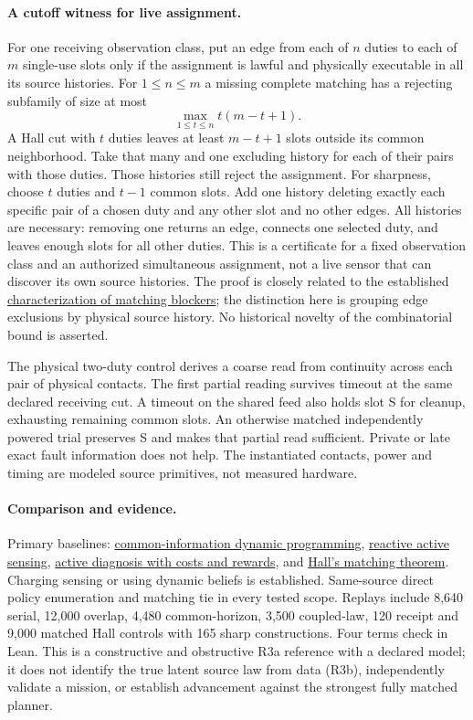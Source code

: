 \documentclass[11pt]{article}
\begin{document}
\paragraph{A cutoff witness for live assignment.}
For one receiving observation class, put an edge from each of $n$
duties to each of $m$ single-use slots only if the assignment is
lawful and physically executable in all its source histories.
For $1\le n\le m$ a missing complete matching has a rejecting
subfamily of size at most
\[
             \max_{1\le t\le n} t(m-t+1).
\]
A Hall cut with $t$ duties leaves at least $m-t+1$ slots outside
its common neighborhood. Take that many and one excluding
history for each of their pairs with those duties. Those
histories still reject the assignment. For sharpness, choose
$t$ duties and $t-1$ common slots. Add one history deleting
exactly each specific pair of a chosen duty and any other
slot and no other edges. All histories are necessary: removing
one returns an edge, connects one selected duty, and leaves
enough slots for all other duties. This is a certificate for a
fixed observation class and an authorized simultaneous
assignment, not a live sensor that can discover its own
source histories. The proof is closely related to the established
\href{https://doi.org/10.1002/jgt.20180}{characterization of matching blockers};
the distinction here is grouping edge exclusions by physical
source history. No historical novelty of the combinatorial
bound is asserted.

The physical two-duty control derives a coarse read from
continuity across each pair of physical contacts. The
first partial reading survives timeout at the same
declared receiving cut. A timeout on the shared feed also
holds slot S for cleanup, exhausting remaining common slots.
An otherwise matched independently powered trial preserves S
and makes that partial read sufficient. Private or late exact
fault information does not help. The instantiated contacts,
power and timing are modeled source primitives, not measured
hardware.

\paragraph{Comparison and evidence.}
Primary baselines: \href{https://arxiv.org/abs/1209.1695}{common-information dynamic programming},
\href{https://arxiv.org/abs/1410.0083}{reactive active sensing},
\href{https://drops.dagstuhl.de/storage/00lipics/lipics-vol391-concur2026/html/LIPIcs.CONCUR.2026.37/LIPIcs.CONCUR.2026.37.html}{active diagnosis with costs and rewards},
and \href{https://doi.org/10.1112/jlms/s1-10.37.26}{Hall's matching theorem}.
Charging sensing or using dynamic beliefs is established.
Same-source direct policy enumeration and matching tie in every
tested scope. Replays include 8,640 serial, 12,000 overlap,
4,480 common-horizon, 3,500 coupled-law, 120 receipt and
9,000 matched Hall controls with 165 sharp constructions.
Four terms check in Lean. This is a constructive and obstructive
R3a reference with a declared model; it does not identify the true
latent source law from data (R3b), independently validate a mission,
or establish advancement against the strongest fully matched planner.
\end{document}
